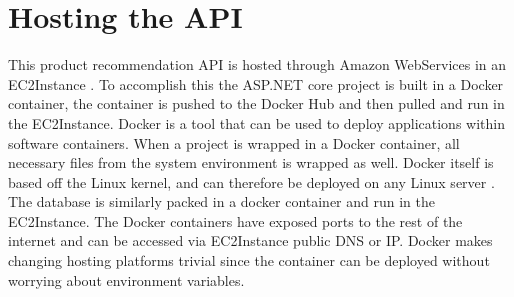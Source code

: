 \section{Hosting the API}
This product recommendation API is hosted through Amazon WebServices in an \gls{EC2Instance} \cite{EC2}. To accomplish this the ASP.NET core project is built in a Docker container, the container is pushed to the Docker Hub and then pulled and run in the \gls{EC2Instance}. Docker is a tool that can be used to deploy applications within software containers. When a project is wrapped in a Docker container, all necessary files from the system environment is wrapped as well. Docker itself is based off the Linux kernel, and can therefore be deployed on any Linux server \cite{Docker}.  The database is similarly packed in a docker container and run in the \gls{EC2Instance}. The Docker containers have exposed ports to the rest of the internet and can be accessed via \gls{EC2Instance} public DNS or IP.  Docker makes changing hosting platforms trivial since the container can be deployed without worrying about environment variables.



			


 